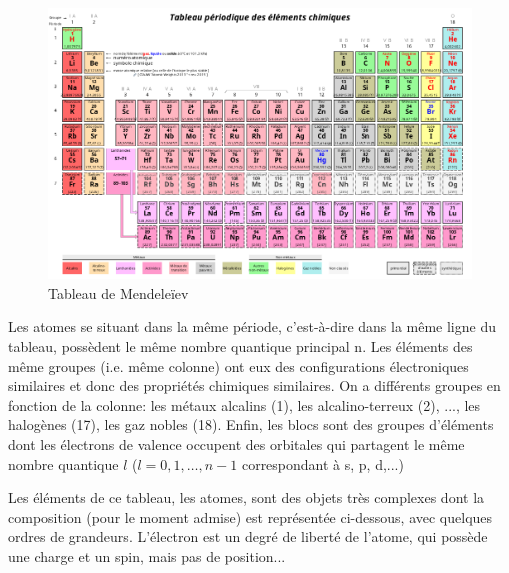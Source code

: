 \begin{figure}[ht]
    \centering
    \includegraphics[scale=0.40]{Images1/mend.png}
    \caption{Tableau de Mendeleïev}
\end{figure}

Les atomes se situant dans la même période, c'est-à-dire dans la même ligne du tableau, possèdent le même nombre quantique principal n. Les éléments des même groupes (i.e. même colonne) ont eux des configurations électroniques similaires et donc des propriétés chimiques similaires. On a différents groupes en fonction de la colonne: les métaux alcalins (1), les alcalino-terreux (2), ..., les halogènes (17), les gaz nobles (18). Enfin, les blocs sont des groupes d'éléments dont les électrons de valence occupent des orbitales qui partagent le même nombre quantique $l$ ($l=0,1, \dots, n-1$ correspondant à s, p, d,...)

Les éléments de ce tableau, les atomes, sont des objets très complexes dont la composition (pour le moment admise) est représentée ci-dessous, avec quelques ordres de grandeurs. L'électron est un degré de liberté de l'atome, qui possède une charge et un spin, mais pas de position...

